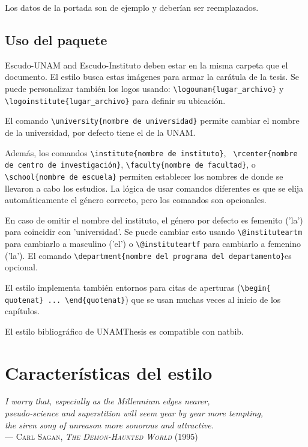 \documentclass[11pt,spanish]{report}
\begin{document}
Los datos de la portada son de ejemplo y deberían ser reemplazados.

\section{Uso del paquete}
Escudo-UNAM and Escudo-Instituto deben estar en la misma carpeta que el documento. El estilo busca estas imágenes para armar la carátula de la tesis. Se puede personalizar también los logos usando: \texttt{\textbackslash{}logounam\{lugar\_archivo\}} y \texttt{\textbackslash{}logoinstitute\{lugar\_archivo\}} para definir su ubicación.

El comando \texttt{\textbackslash{}university\{nombre de universidad\}} permite cambiar el nombre de la universidad, por defecto tiene el de la UNAM.

Además, los comandos \texttt{\textbackslash{}institute\{nombre de instituto\}}, \texttt{
\textbackslash{}rcenter\{nombre de centro de investigación\}},
\texttt{\textbackslash{}faculty\{nombre de facultad\}}, o
\texttt{\textbackslash{}school\{nombre de escuela\}} 
permiten establecer los nombres de donde se llevaron a cabo los estudios. La lógica de usar comandos diferentes es que se elija automáticamente el género correcto, pero los comandos son opcionales.

En caso de omitir el nombre del instituto, el género por defecto es femenito ('la') para coincidir con 'universidad'.
Se puede cambiar esto usando \texttt{\textbackslash{}@instituteartm} para cambiarlo a masculino ('el') o \texttt{\textbackslash{}@instituteartf} para cambiarlo a femenino
('la'). El comando \texttt{\textbackslash{}department\{nombre del programa del departamento\}}es opcional.


El estilo implementa también entornos para citas de aperturas
(\texttt{\textbackslash{}begin\{
quotenat\} ... \textbackslash{}end\{quotenat\}})
que se usan muchas veces al inicio de los capítulos.

El estilo bibliográfico de UNAMThesis es compatible con natbib.

\chapter{Características del estilo}

\begin{quotenat}
\textsl{I worry that, especially as the Millennium edges nearer,\\
pseudo-science and superstition will seem year by year more tempting,\\
the siren song of unreason more sonorous and attractive.}\\
--- \textsc{Carl Sagan, \textit{The Demon-Haunted World} (1995)}
\end{quotenat}
\end{document}
